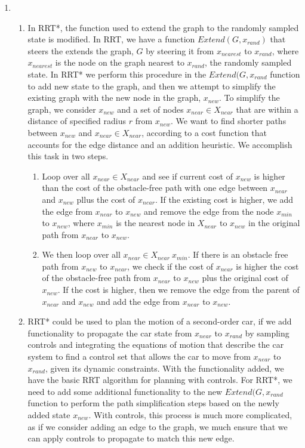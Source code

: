 \documentclass[11pt]{article}
\begin{document}
\begin{enumerate}[leftmargin=0.3in]
\begin{enumerate}
   \end{enumerate} %

   \item %
   \begin{enumerate}
       \item In RRT*, the function used to extend the graph to the randomly sampled state is modified. In RRT, we have a function $Extend(G, x_{rand})$ that steers the extends the graph, $G$ by steering it from $x_{nearest}$ to $x_{rand}$, where $x_{nearest}$ is the node on the graph nearest to $x_{rand}$, the randomly sampled state. In RRT* we perform this procedure in the $Extend(G, x_{rand}$ function to add new state to the graph, and then we attempt to simplify the existing graph with the new node in the graph, $x_{new}$. To simplify the graph, we consider $x_{new}$ and a set of nodes $x_{near} \in X_{near}$ that are within a distance of specified radius $r$ from $x_{new}$. We want to find shorter paths between $x_{new}$ and $x_{near} \in X_{near}$, according to a cost function that accounts for the edge distance and an addition heuristic. We accomplish this task in two steps.
           \begin{enumerate}
               \item Loop over all $x_{near} \in X_{near}$ and see if current cost of $x_{new}$ is higher than the cost of the obstacle-free path with one edge between $x_{near}$ and $x_{new}$ pllus the cost of $x_{near}$. If the existing cost is higher, we add the edge from $x_{near}$ to $x_{new}$ and remove the edge from the node $x_{min}$ to $x_{new}$, where $x_{min}$ is the nearest node in $X_{near}$ to $x_{new}$ in the original path from $x_{near}$ to $x_{new}$.
               \item We then loop over all $x_{near} \in X_{near} \ x_{min}$. If there is an obstacle free path from $x_{new}$ to $x_{near}$, we check if the cost of $x_{near}$ is higher the cost of the obstacle-free path from $x_{near}$ to $x_{new}$ plus the original cost of $x_{new}$. If the cost is higher, then we remove the edge from the parent of $x_{near}$ and $x_{new}$ and add the edge from $x_{near}$ to $x_{new}$.
           \end{enumerate}

       \item RRT* could be used to plan the motion of a second-order car, if we add functionality to propagate the car state from $x_{near}$ to $x_{rand}$ by sampling controls and integrating the equations of motion that describe the car system to find a control set that allows the car to move from $x_{near}$ to $x_{rand}$, given its dynamic constraints. With the functionality added, we have the basic RRT algorithm for planning with controls. For RRT*, we need to add some additional functionality to the new $Extend(G, x_{rand}$ function to perform the path simplification steps based on the newly added state $x_{new}$. With controls, this process is much more complicated, as if we consider adding an edge to the graph, we much ensure that we can apply controls to propagate to match this new edge.


\end{enumerate}
\end{enumerate}
\end{document}
